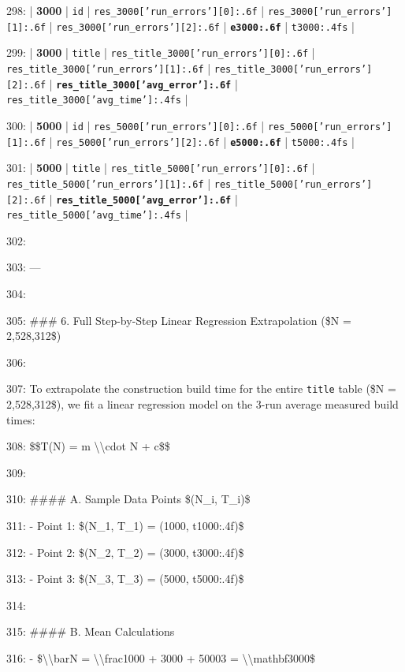 \documentclass[11pt,a4paper]{article}
\begin{document}
298: | \textbf{3000} | \texttt{id} | \texttt{{res\_3000['run\_errors'][0]:.6f}} | \texttt{{res\_3000['run\_errors'][1]:.6f}} | \texttt{{res\_3000['run\_errors'][2]:.6f}} | \textbf{\texttt{{e3000:.6f}}} | \texttt{{t3000:.4f}s} |

299: | \textbf{3000} | \texttt{title} | \texttt{{res\_title\_3000['run\_errors'][0]:.6f}} | \texttt{{res\_title\_3000['run\_errors'][1]:.6f}} | \texttt{{res\_title\_3000['run\_errors'][2]:.6f}} | \textbf{\texttt{{res\_title\_3000['avg\_error']:.6f}}} | \texttt{{res\_title\_3000['avg\_time']:.4f}s} |

300: | \textbf{5000} | \texttt{id} | \texttt{{res\_5000['run\_errors'][0]:.6f}} | \texttt{{res\_5000['run\_errors'][1]:.6f}} | \texttt{{res\_5000['run\_errors'][2]:.6f}} | \textbf{\texttt{{e5000:.6f}}} | \texttt{{t5000:.4f}s} |

301: | \textbf{5000} | \texttt{title} | \texttt{{res\_title\_5000['run\_errors'][0]:.6f}} | \texttt{{res\_title\_5000['run\_errors'][1]:.6f}} | \texttt{{res\_title\_5000['run\_errors'][2]:.6f}} | \textbf{\texttt{{res\_title\_5000['avg\_error']:.6f}}} | \texttt{{res\_title\_5000['avg\_time']:.4f}s} |

302:

303: ---

304:

305: \#\#\# 6. Full Step-by-Step Linear Regression Extrapolation (\$N = 2,528,312\$)

306:

307: To extrapolate the construction build time for the entire \texttt{title} table (\$N = 2,528,312\$), we fit a linear regression model on the 3-run average measured build times:

308: \$\$T(N) = m \textbackslash{}\textbackslash{}cdot N + c\$\$

309:

310: \#\#\#\# A. Sample Data Points \$(N\_i, T\_i)\$

311: - Point 1: \$(N\_1, T\_1) = (1000, {t1000:.4f})\$

312: - Point 2: \$(N\_2, T\_2) = (3000, {t3000:.4f})\$

313: - Point 3: \$(N\_3, T\_3) = (5000, {t5000:.4f})\$

314:

315: \#\#\#\# B. Mean Calculations

316: - \$\textbackslash{}\textbackslash{}bar{{N}} = \textbackslash{}\textbackslash{}frac{{1000 + 3000 + 5000}}{{3}} = \textbackslash{}\textbackslash{}mathbf{{3000}}\$
\end{document}
